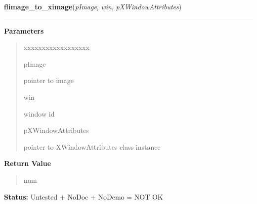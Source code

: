 \hspace{.8\funcindent}\begin{boxedminipage}{\funcwidth}

    \raggedright \textbf{flimage\_to\_ximage}(\textit{pImage}, \textit{win}, \textit{pXWindowAttributes})

    \vspace{-1.5ex}

    \rule{\textwidth}{0.5\fboxrule}
\setlength{\parskip}{2ex}
\setlength{\parskip}{1ex}
      \textbf{Parameters}
      \vspace{-1ex}

      \begin{quote}
        \begin{Ventry}{xxxxxxxxxxxxxxxxxx}

          \item[pImage]

          pointer to image

          \item[win]

          window id

          \item[pXWindowAttributes]

          pointer to XWindowAttributes class instance

        \end{Ventry}

      \end{quote}

      \textbf{Return Value}
    \vspace{-1ex}

      \begin{quote}
      num

      \end{quote}

\textbf{Status:} Untested + NoDoc + NoDemo = NOT OK



    \end{boxedminipage}

    \label{xformslib:library:flimage_write_annotation}

    \vspace{0.5ex}

